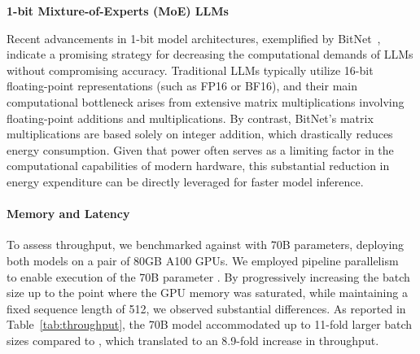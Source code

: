 \begin{abstract}
Recent advancements, such as BitNet~\cite{bitnet}, are ushering in a transformative era characterized by 1-bit Large Language Models (LLMs). In this study, we present a new 1-bit LLM, denoted as \textbf{}, where each parameter (or weight) of the LLM adopts one of three values from the set \{-1, 0, 1\}. This approach achieves parity with full-precision (e.g., FP16 or BF16) Transformer LLMs—matched by both perplexity and performance on downstream tasks—while providing substantial gains in latency, memory usage, throughput, and energy efficiency. Notably, the 1.58-bit LLM framework offers a novel scaling law and methodology for training the next wave of LLMs that prioritize both efficiency and accuracy. In addition, it establishes a foundation for alternative computational paradigms and paves the way for dedicated hardware architectures tailored specifically to 1-bit LLM workloads.
\end{abstract}

\textbf{1-bit Mixture-of-Experts (MoE) LLMs}

Recent advancements in 1-bit model architectures, exemplified by BitNet~\cite{bitnet}, indicate a promising strategy for decreasing the computational demands of LLMs without compromising accuracy. Traditional LLMs typically utilize 16-bit floating-point representations (such as FP16 or BF16), and their main computational bottleneck arises from extensive matrix multiplications involving floating-point additions and multiplications. By contrast, BitNet’s matrix multiplications are based solely on integer addition, which drastically reduces energy consumption. Given that power often serves as a limiting factor in the computational capabilities of modern hardware, this substantial reduction in energy expenditure can be directly leveraged for faster model inference.

\paragraph{Memory and Latency}

To assess throughput, we benchmarked  against  with 70B parameters, deploying both models on a pair of 80GB A100 GPUs. We employed pipeline parallelism~\cite{gpipe} to enable execution of the 70B parameter . By progressively increasing the batch size up to the point where the GPU memory was saturated, while maintaining a fixed sequence length of 512, we observed substantial differences. As reported in Table~\ref{tab:throughput}, the 70B  model accommodated up to 11-fold larger batch sizes compared to , which translated to an 8.9-fold increase in throughput.

